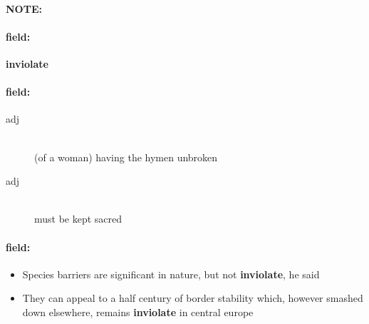 \documentclass[12pt]{article}
\newenvironment{note}{\paragraph{NOTE:}}{}
\newenvironment{field}{\paragraph{field:}}{}
\begin{document}
\begin{note}
\begin{field}
\textbf{\large inviolate}
\end{field}


\begin{field}
\begin{description}
\item[adj] \hfill \\ 
(of a woman) having the hymen unbroken

\item[adj] \hfill \\ 
must be kept sacred

\end{description}
\end{field}

\begin{field}
\begin{itemize}
\item Species barriers are significant in nature, but not \textbf{inviolate}, he said
\item They can appeal to a half century of border stability which, however smashed down elsewhere, remains \textbf{inviolate} in central europe
\end{itemize}
\end{field}
\end{note}
\end{document}
